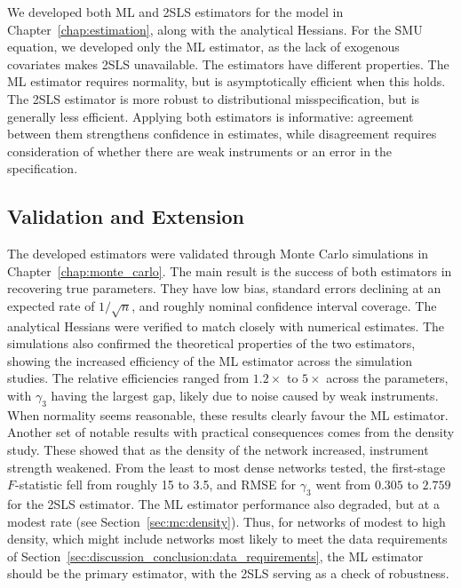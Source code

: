 We developed both ML and 2SLS estimators for the model in Chapter~\ref{chap:estimation}, along with the analytical Hessians. For the SMU equation, we developed only the ML estimator, as the lack of exogenous covariates makes 2SLS unavailable. The estimators have different properties. The ML estimator requires normality, but is asymptotically efficient when this holds. The 2SLS estimator is more robust to distributional misspecification, but is generally less efficient. Applying both estimators is informative: agreement between them strengthens confidence in estimates, while disagreement requires consideration of whether there are weak instruments or an error in the specification.

\subsection{Validation and Extension}

The developed estimators were validated through Monte Carlo simulations in Chapter~\ref{chap:monte_carlo}. The main result is the success of both estimators in recovering true parameters. They have low bias, standard errors declining at an expected rate of $1/\sqrt{n}$, and roughly nominal confidence interval coverage. The analytical Hessians were verified to match closely with numerical estimates. The simulations also confirmed the theoretical properties of the two estimators, showing the increased efficiency of the ML estimator across the simulation studies. The relative efficiencies ranged from $1.2\times$ to $5\times$ across the parameters, with $\gamma_3$ having the largest gap, likely due to noise caused by weak instruments. When normality seems reasonable, these results clearly favour the ML estimator. Another set of notable results with practical consequences comes from the density study. These showed that as the density of the network increased, instrument strength weakened. From the least to most dense networks tested, the first-stage $F$-statistic fell from roughly 15 to 3.5, and RMSE for $\gamma_3$ went from $0.305$ to $2.759$ for the 2SLS estimator. The ML estimator performance also degraded, but at a modest rate (see Section~\ref{sec:mc:density}). Thus, for networks of modest to high density, which might include networks most likely to meet the data requirements of Section~\ref{sec:discussion_conclusion:data_requirements}, the ML estimator should be the primary estimator, with the 2SLS serving as a check of robustness.

